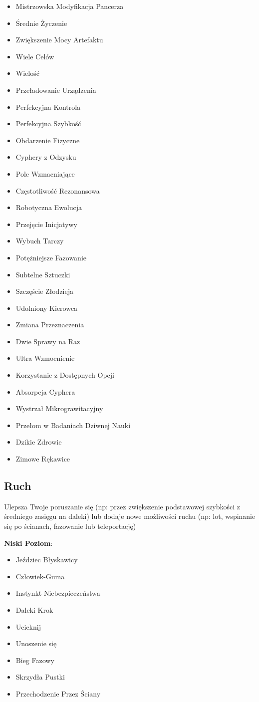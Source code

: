 \begin{itemize}
\item Mistrzowska Modyfikacja Pancerza
\item Średnie Życzenie
\item Zwiększenie Mocy Artefaktu
\item Wiele Celów
\item Wielość
\item Przeładowanie Urządzenia
\item Perfekcyjna Kontrola
\item Perfekcyjna Szybkość
\item Obdarzenie Fizyczne
\item Cyphery z Odzysku
\item Pole Wzmacniające
\item Częstotliwość Rezonansowa
\item Robotyczna Ewolucja
\item Przejęcie Inicjatywy
\item Wybuch Tarczy
\item Potężniejsze Fazowanie
\item Subtelne Sztuczki
\item Szczęście Złodzieja
\item Udolniony Kierowca
\item Zmiana Przeznaczenia
\item Dwie Sprawy na Raz
\item Ultra Wzmocnienie
\item Korzystanie z Dostępnych Opcji
\item Absorpcja Cyphera
\item Wystrzał Mikrograwitacyjny
\item Przełom w Badaniach Dziwnej Nauki
\item Dzikie Zdrowie
\item Zimowe Rękawice
\end{itemize}

\subsection{Ruch}

Ulepsza Twoje poruszanie się (np: przez zwiększenie podstawowej szybkości z średniego zasięgu na daleki) lub dodaje nowe możliwości ruchu (np: lot, wspinanie się po ścianach, fazowanie lub teleportację)

\textbf{Niski Poziom}:

\begin{itemize}
\item Jeździec Błyskawicy
\item Człowiek-Guma
\item Instynkt Niebezpieczeństwa
\item Daleki Krok
\item Ucieknij
\item Unoszenie się
\item Bieg Fazowy
\item Skrzydła Pustki
\item Przechodzenie Przez Ściany
\end{itemize}


